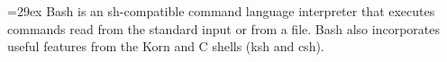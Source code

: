 \hsize=29ex
Bash is an sh-compatible command language interpreter that executes commands read from the standard input or from a file. Bash also incorporates useful features from the Korn and C shells (ksh and csh).
\bye
